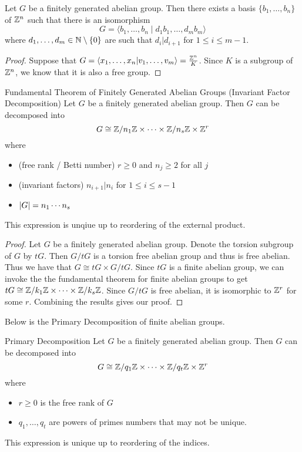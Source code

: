\documentclass[a4paper]{article}
\begin{document}
\begin{prp}{}{} Let $G$ be a finitely generated abelian group. Then there exists a basis $\{b_1,\dots,b_n\}$ of $\mathbb{Z}^n$ such that there is an isomorphism $$G=\langle b_1,\dots,b_n\;|\;d_1b_1,\dots,d_mb_m\rangle$$ where $d_1,\dots,d_m\in\mathbb{N}\setminus\{0\}$ are such that $d_i|d_{i+1}$ for $1\leq i\leq m-1$. 
\begin{proof}
Suppose that $G=\langle x_1,\dots,x_n|v_1,\dots,v_m\rangle=\frac{\mathbb{Z}^n}{K}$. Since $K$ is a subgroup of $\mathbb{Z}^n$, we know that it is also a free group. 
\end{proof}
\end{prp}

\begin{thm}{Fundamental Theorem of Finitely Generated Abelian Groups (Invariant Factor Decomposition)}{} Let $G$ be a finitely generated abelian group. Then $G$ can be decomposed into $$G\cong \mathbb{Z}/n_1\mathbb{Z}\times\cdots\times\mathbb{Z}/n_s\mathbb{Z}\times\mathbb{Z}^r$$ where 
\begin{itemize}
\item (free rank / Betti number) $r\geq 0$ and $n_j\geq 2$ for all $j$
\item (invariant factors) $n_{i+1}|n_i$ for $1\leq i\leq s-1$
\item $\abs{G}=n_1\cdots n_s$
\end{itemize}
This expression is unqiue up to reordering of the external product. 
\begin{proof}
Let $G$ be a finitely generated abelian group. Denote the torsion subgroup of $G$ by $tG$. Then $G/tG$ is a torsion free abelian group and thus is free abelian. Thus we have that $G\cong tG\times G/tG$. Since $tG$ is a finite abelian group, we can invoke the the fundamental theorem for finite abelian groups to get $tG\cong\mathbb{Z}/k_1\mathbb{Z}\times\cdots\times\mathbb{Z}/k_s\mathbb{Z}$. Since $G/tG$ is free abelian, it is isomorphic to $\mathbb{Z}^r$ for some $r$. Combining the results gives our proof. 
\end{proof}
\end{thm}

Below is the Primary Decomposition of finite abelian groups. 

\begin{thm}{Primary Decomposition}{} Let $G$ be a finitely generated abelian group. Then $G$ can be decomposed into $$G\cong\mathbb{Z}/q_1\mathbb{Z}\times\cdots\times\mathbb{Z}/q_t\mathbb{Z}\times\mathbb{Z}^r$$ where 
\begin{itemize}
\item $r\geq 0$ is the free rank of $G$
\item $q_1,\dots,q_t$ are powers of primes numbers that may not be unique. 
\end{itemize}
This expression is unique up to reordering of the indices. 
\end{thm}
\end{document}

